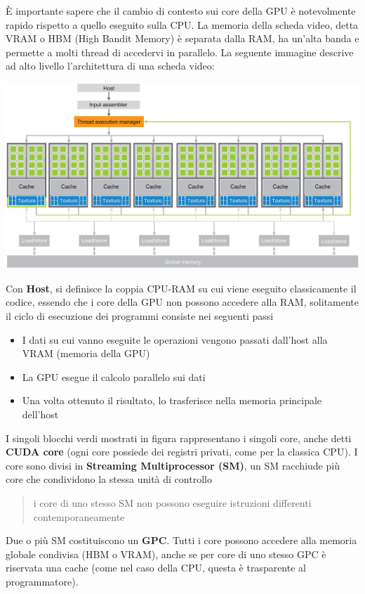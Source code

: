 \documentclass[10pt, letterpaper]{report}
\begin{document}
È importante sapere che il cambio di contesto sui core della GPU è notevolmente rapido rispetto a quello eseguito sulla CPU. La memoria della scheda video, detta VRAM o HBM (High Bandit Memory) è separata dalla RAM, ha un'alta banda e permette a molti thread di accedervi in parallelo.\acc 
La seguente immagine descrive ad alto livello l'architettura di una scheda video:\begin{center}
    \includegraphics[width=\textwidth ]{images/architetturaGPU.png}
\end{center}
Con \textbf{Host}, si definisce la coppia CPU-RAM su cui viene eseguito classicamente il codice, essendo che i core della GPU non possono accedere alla RAM, solitamente il ciclo di esecuzione dei programmi consiste nei seguenti passi\begin{itemize}
    \item I dati su cui vanno eseguite le operazioni vengono passati dall'host alla VRAM (memoria della GPU)
    \item La GPU esegue il calcolo parallelo sui dati 
    \item Una volta ottenuto il risultato, lo trasferisce nella memoria principale dell'host
\end{itemize}
I singoli blocchi verdi mostrati in figura rappresentano i singoli core, anche detti \textbf{CUDA core} (ogni core possiede dei registri privati, come per la classica CPU). I core sono divisi in \textbf{Streaming Multiprocessor (SM)}, un SM racchiude più core che condividono la stessa unità di controllo\begin{quote}
    i core di uno stesso SM non possono eseguire istruzioni differenti contemporaneamente
\end{quote}
Due o più SM costituiscono un \textbf{GPC}. Tutti i core possono accedere alla memoria globale condivisa (HBM o VRAM), anche se per core di uno stesso GPC è riservata una cache (come nel caso della CPU, questa è trasparente al programmatore).
\end{document}
